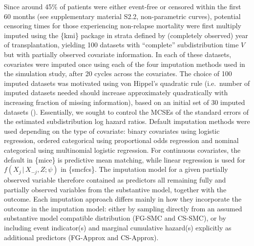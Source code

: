 \documentclass[
  letterpaper,
  paper=240mm:170mm,
  twoside=true,
  open=right,
  fontsize=10pt,
  pagesize=false,
  BCOR=15mm,
  DIV=14,
  headinclude=true,
  footinclude=false,
  headsepline=on]{scrbook}
\newcommand{\given}{\,|\,}
\begin{document}
Since around 45\% of patients were either event-free or censored within
the first 60 months (see supplementary material S2.2, non-parametric
curves), potential censoring times for those experiencing non-relapse
mortality were first multiply imputed using the \{kmi\} package in
strata defined by (completely observed) year of transplantation,
yielding 100 datasets with ``complete'' subdistribution time \(V\) but
with partially observed covariate information. In each of these
datasets, covariates were imputed once using each of the four imputation
methods used in the simulation study, after 20 cycles across the
covariates. The choice of 100 imputed datasets was motivated using von
Hippel's quadratic rule (i.e.~number of imputed datasets needed should
increase approximately quadratically with increasing fraction of missing
information), based on an initial set of 30 imputed datasets
().
Essentially, we sought to control the MCSEs of the standard errors of
the estimated subdistribution log hazard ratios. Default imputation
methods were used depending on the type of covariate: binary covariates
using logistic regression, ordered categorical using proportional odds
regression and nominal categorical using multinomial logistic
regression. For continuous covariates, the default in \{mice\} is
predictive mean matching, while linear regression is used for
\(f(X_j \given X_{-j}, Z;\psi)\) in \{smcfcs\}. The imputation model for
a given partially observed variable therefore contained as predictors
all remaining fully and partially observed variables from the
substantive model, together with the outcome. Each imputation approach
differs mainly in how they incorporate the outcome in the imputation
model: either by sampling directly from an assumed substantive model
compatible distribution (FG-SMC and CS-SMC), or by including event
indicator(s) and marginal cumulative hazard(s) explicitly as additional
predictors (FG-Approx and CS-Approx).
\end{document}
